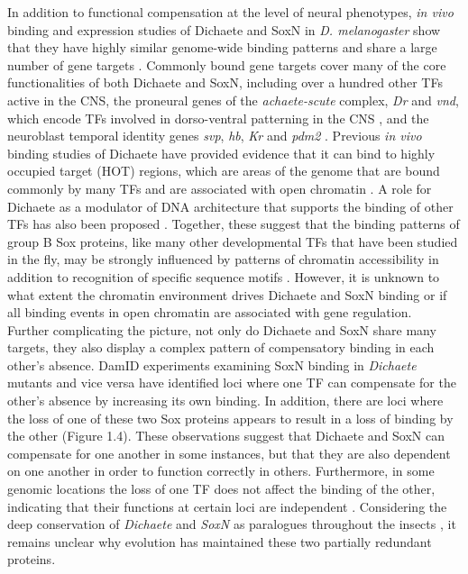 In addition to functional compensation at the level of neural phenotypes, \emph{in vivo} binding and expression studies of Dichaete and SoxN in \emph{D. melanogaster} show that they have highly similar genome-wide binding patterns and share a large number of gene targets \citep{aleksic_role_2013,ferrero_soxneuro_2014}. Commonly bound gene targets cover many of the core functionalities of both Dichaete and SoxN, including over a hundred other TFs active in the CNS, the proneural genes of the \emph{achaete-scute} complex, \emph{Dr} and \emph{vnd}, which encode TFs involved in dorso-ventral patterning in the CNS \citep{zhao_genetic_2007}, and the neuroblast temporal identity genes \emph{svp}, \emph{hb}, \emph{Kr} and \emph{pdm2} \citep{ferrero_soxneuro_2014,isshiki_drosophila_2001,maurange_brainy_2005}. Previous \emph{in vivo} binding studies of Dichaete have provided evidence that it can bind to highly occupied target (HOT) regions, which are areas of the genome that are bound commonly by many TFs and are associated with open chromatin \citep{aleksic_role_2013,kvon_hot_2012}. A role for Dichaete as a modulator of DNA architecture that supports the binding of other TFs has also been proposed \citep{russell_dichaete_1996}. Together, these suggest that the binding patterns of group B Sox proteins, like many other developmental TFs that have been studied in the fly, may be strongly influenced by patterns of chromatin accessibility in addition to recognition of specific sequence motifs \citep{ferrero_soxneuro_2014,macarthur_developmental_2009}. However, it is unknown to what extent the chromatin environment drives Dichaete and SoxN binding or if all binding events in open chromatin are associated with gene regulation.\\

Further complicating the picture, not only do Dichaete and SoxN share many targets, they also display a complex pattern of compensatory binding in each other’s absence. DamID experiments examining SoxN binding in \emph{Dichaete} mutants and vice versa have identified loci where one TF can compensate for the other’s absence by increasing its own binding. In addition, there are loci where the loss of one of these two Sox proteins appears to result in a loss of binding by the other (Figure 1.4). These observations suggest that Dichaete and SoxN can compensate for one another in some instances, but that they are also dependent on one another in order to function correctly in others. Furthermore, in some genomic locations the loss of one TF does not affect the binding of the other, indicating that their functions at certain loci are independent \citep{ferrero_soxneuro_2014}. Considering the deep conservation of \emph{Dichaete} and \emph{SoxN} as paralogues throughout the insects \citep{mckimmie_conserved_2005,wilson_evolution_2008}, it remains unclear why evolution has maintained these two partially redundant proteins. \\


